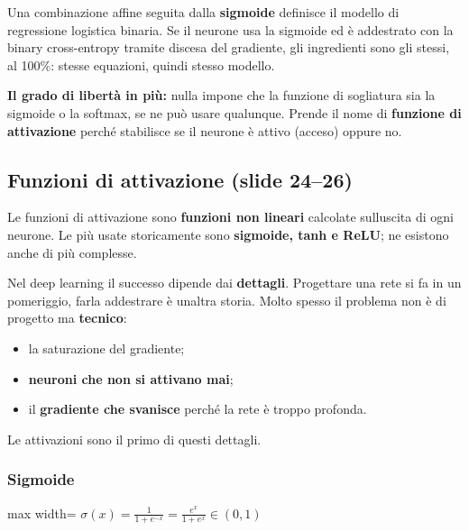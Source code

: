 \documentclass[11pt,a4paper,oneside,openany]{book}
\providecommand{\tightlist}{\setlength{\itemsep}{0pt}\setlength{\parskip}{0pt}}
\renewenvironment{quote}{\list{}{\leftmargin=1em\rightmargin=0pt}\item\relax}{\endlist}
\begin{document}
\begin{quote}
Una combinazione affine seguita dalla \textbf{sigmoide} definisce il modello di regressione logistica binaria. Se il neurone usa la sigmoide ed è addestrato con la binary cross-entropy tramite discesa del gradiente, gli ingredienti sono gli stessi, al 100\%: stesse equazioni, quindi stesso modello.

\textbf{Il grado di libertà in più:} nulla impone che la funzione di sogliatura sia la sigmoide o la softmax, se ne può usare qualunque. Prende il nome di \textbf{funzione di attivazione} perché stabilisce se il neurone è attivo (acceso) oppure no.
\end{quote}

\subsection{Funzioni di attivazione (slide 24--26)}\label{f01-r304}

Le funzioni di attivazione sono \textbf{funzioni non lineari} calcolate sull\textquotesingle uscita di ogni neurone. Le più usate storicamente sono \textbf{sigmoide, tanh e ReLU}; ne esistono anche di più complesse.

Nel deep learning il successo dipende dai \textbf{dettagli}. Progettare una rete si fa in un pomeriggio, farla addestrare è un\textquotesingle altra storia. Molto spesso il problema non è di progetto ma \textbf{tecnico}:

\begin{itemize}
\tightlist
\item
  la saturazione del gradiente;
\item
  \textbf{neuroni che non si attivano mai};
\item
  il \textbf{gradiente che svanisce} perché la rete è troppo profonda.
\end{itemize}

Le attivazioni sono il primo di questi dettagli.

\subsubsection{Sigmoide}\label{f01-r316}

\begin{center}
\begin{adjustbox}{max width=\linewidth}
$\displaystyle 
\boxed{\sigma(x) = \frac{1}{1+e^{-x}} = \frac{e^{x}}{1+e^{x}} \in (0,1)}
$
\end{adjustbox}
\end{center}
\end{document}
